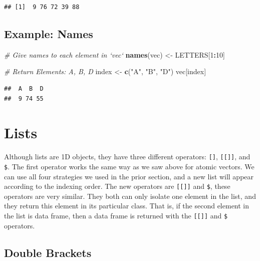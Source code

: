 \documentclass[
]{book}
\newenvironment{Shaded}{\begin{snugshade}}{\end{snugshade}}
\newcommand{\CommentTok}[1]{\textcolor[rgb]{0.56,0.35,0.01}{\textit{#1}}}
\newcommand{\DecValTok}[1]{\textcolor[rgb]{0.00,0.00,0.81}{#1}}
\newcommand{\KeywordTok}[1]{\textcolor[rgb]{0.13,0.29,0.53}{\textbf{#1}}}
\newcommand{\NormalTok}[1]{#1}
\newcommand{\OperatorTok}[1]{\textcolor[rgb]{0.81,0.36,0.00}{\textbf{#1}}}
\newcommand{\StringTok}[1]{\textcolor[rgb]{0.31,0.60,0.02}{#1}}
\begin{document}
\begin{verbatim}
## [1]  9 76 72 39 88
\end{verbatim}

\hypertarget{example-names}{%
\subsection*{Example: Names}\label{example-names}}

\begin{Shaded}
\begin{Highlighting}[]
\CommentTok{# Give names to each element in `vec`}
\KeywordTok{names}\NormalTok{(vec) <-}\StringTok{ }\NormalTok{LETTERS[}\DecValTok{1}\OperatorTok{:}\DecValTok{10}\NormalTok{]}

\CommentTok{# Return Elements: A, B, D}
\NormalTok{index <-}\StringTok{ }\KeywordTok{c}\NormalTok{(}\StringTok{"A"}\NormalTok{, }\StringTok{"B"}\NormalTok{, }\StringTok{"D"}\NormalTok{)}
\NormalTok{vec[index]}
\end{Highlighting}
\end{Shaded}

\begin{verbatim}
##  A  B  D 
##  9 74 55
\end{verbatim}

\hypertarget{lists-1}{%
\section{Lists}\label{lists-1}}

Although lists are 1D objects, they have three different operators: \texttt{{[}{]}}, \texttt{{[}{[}{]}{]}}, and \texttt{\$}. The first operator works the same way as we saw above for atomic vectors. We can use all four strategies we used in the prior section, and a new list will appear according to the indexing order. The new operators are \texttt{{[}{[}{]}{]}} and \texttt{\$}, these operators are very similar. They both can only isolate one element in the list, and they return this element in its particular class. That is, if the second element in the list is data frame, then a data frame is returned with the \texttt{{[}{[}{]}{]}} and \texttt{\$} operators.

\hypertarget{double-brackets}{%
\subsection{Double Brackets}\label{double-brackets}}
\end{document}
